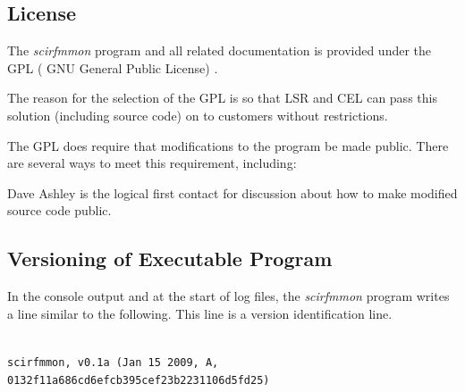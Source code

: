 \documentclass[letterpaper,10pt,titlepage]{article}
\newcommand{\productname}{scirfmmon}
\newcommand{\productnameemph}{\emph{\productname}}
\begin{document}
\subsection{License}
\label{siov0:slic0}

The \productnameemph{} program and all related documentation
is provided under the GPL (%
GNU General Public
License) \cite{bibref:swlic:gpl}.

The reason for the selection of the GPL is so that LSR and CEL can pass this solution
(including source code) on to customers without restrictions.

The GPL does require that modifications to the program be made public.  There
are several ways to meet this requirement, including:


Dave Ashley \cite{bibref:i:daveashley} is the logical first contact for discussion
about how to make modified source code public.


\subsection{Versioning of Executable Program}
\label{siov0:svin0}
 
In the console output and at the start of log files, the
\productnameemph{} program writes a line similar to the following.  This
line is a version identification line.
\\\\
\begin{footnotesize}
\noindent{}\texttt{scirfmmon, v0.1a (Jan 15 2009, A, 0132f11a686cd6efcb395cef23b2231106d5fd25)}\\
\end{footnotesize}
\end{document}

